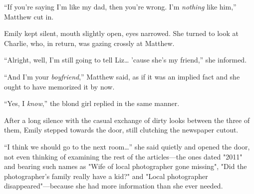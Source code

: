 “If you're saying I'm like my dad, then you're wrong. I'm \textit{nothing} like him,” Matthew cut in.

Emily kept silent, mouth slightly open, eyes narrowed. She turned to look at Charlie, who, in return, was gazing crossly at Matthew.

“Alright, well, I'm still going to tell Liz… 'cause she's my friend,” she informed.

“And I'm your \textit{boyfriend},” Matthew said, as if it was an implied fact and she ought to have memorized it by now.

“Yes, I \textit{know},” the blond girl replied in the same manner.

After a long silence with the casual exchange of dirty looks between the three of them, Emily stepped towards the door, still clutching the newspaper cutout.

“I think we should go to the next room…” she said quietly and opened the door, not even thinking of examining the rest of the articles—the ones dated "2011" and bearing such names as "Wife of local photographer gone missing", "Did the photographer's family really have a kid?" and "Local photographer disappeared"—because she had more information than she ever needed.